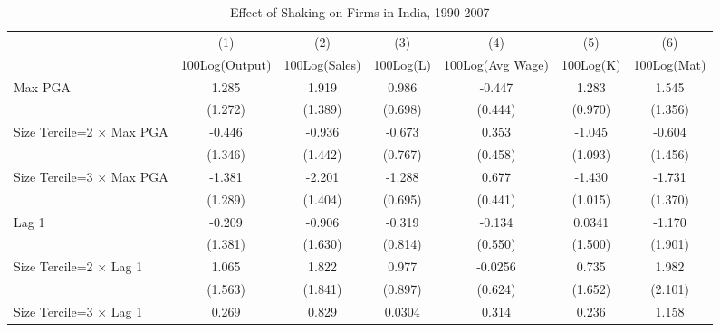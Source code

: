 \begin{table}[htbp]\centering
\def\sym#1{\ifmmode^{#1}\else\(^{#1}\)\fi}
\caption{Effect of Shaking on Firms in India, 1990-2007}
\begin{tabular}{l*{6}{c}}
\toprule
                &\multicolumn{1}{c}{(1)}&\multicolumn{1}{c}{(2)}&\multicolumn{1}{c}{(3)}&\multicolumn{1}{c}{(4)}&\multicolumn{1}{c}{(5)}&\multicolumn{1}{c}{(6)}\\
                &\multicolumn{1}{c}{100Log(Output)}&\multicolumn{1}{c}{100Log(Sales)}&\multicolumn{1}{c}{100Log(L)}&\multicolumn{1}{c}{100Log(Avg Wage)}&\multicolumn{1}{c}{100Log(K)}&\multicolumn{1}{c}{100Log(Mat)}\\
\midrule
Max PGA         &    1.285         &    1.919         &    0.986         &   -0.447         &    1.283         &    1.545         \\
                &  (1.272)         &  (1.389)         &  (0.698)         &  (0.444)         &  (0.970)         &  (1.356)         \\
\addlinespace
Size Tercile=2 $\times$ Max PGA&   -0.446         &   -0.936         &   -0.673         &    0.353         &   -1.045         &   -0.604         \\
                &  (1.346)         &  (1.442)         &  (0.767)         &  (0.458)         &  (1.093)         &  (1.456)         \\
\addlinespace
Size Tercile=3 $\times$ Max PGA&   -1.381         &   -2.201         &   -1.288         &    0.677         &   -1.430         &   -1.731         \\
                &  (1.289)         &  (1.404)         &  (0.695)         &  (0.441)         &  (1.015)         &  (1.370)         \\
\addlinespace
Lag 1           &   -0.209         &   -0.906         &   -0.319         &   -0.134         &   0.0341         &   -1.170         \\
                &  (1.381)         &  (1.630)         &  (0.814)         &  (0.550)         &  (1.500)         &  (1.901)         \\
\addlinespace
Size Tercile=2 $\times$ Lag 1&    1.065         &    1.822         &    0.977         &  -0.0256         &    0.735         &    1.982         \\
                &  (1.563)         &  (1.841)         &  (0.897)         &  (0.624)         &  (1.652)         &  (2.101)         \\
\addlinespace
Size Tercile=3 $\times$ Lag 1&    0.269         &    0.829         &   0.0304         &    0.314         &    0.236         &    1.158         \\

\end{tabular}
\end{table}
